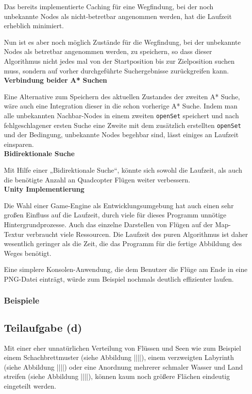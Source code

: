 \documentclass[a4paper,12pt]{article}
\newcommand{\code}{\texttt}
\begin{document}
Das bereits implementierte Caching für eine Wegfindung, bei der noch unbekannte Nodes als nicht-betretbar angenommen werden, hat die Laufzeit erheblich minimiert.

Nun ist es aber noch möglich Zustände für die Wegfindung, bei der unbekannte Nodes als betretbar angenommen werden, zu speichern, so dass dieser Algorithmus nicht jedes mal von der Startposition bis zur Zielposition suchen muss, sondern auf vorher durchgeführte Suchergebnisse zurückgreifen kann.
\\[0.4cm]
\textbf{Verbindung beider A* Suchen}

Eine Alternative zum Speichern des aktuellen Zustandes der zweiten A* Suche, wäre auch eine Integration dieser in die schon vorherige A* Suche. Indem man alle unbekannten Nachbar-Nodes in einem zweiten \code{openSet} speichert und nach fehlgeschlagener ersten Suche eine Zweite mit dem zusätzlich erstellten \code{openSet} und der Bedingung, unbekannte Nodes begehbar sind, lässt einiges an Laufzeit einsparen.
\\[0.4cm]
\textbf{Bidirektionale Suche}

Mit Hilfe einer „Bidirektionale Suche“, könnte sich sowohl die Laufzeit, als auch die benötigte Anzahl an Quadcopter Flügen weiter verbessern.
\\[0.4cm]
\textbf{Unity Implementierung}

Die Wahl einer Game-Engine als Entwicklungsumgebung hat auch einen sehr großen Einfluss auf die Laufzeit, durch viele für dieses Programm unnötige Hintergrundprozesse. Auch das einzelne Darstellen von Flügen auf der Map-Textur verbraucht viele Ressourcen. Die Laufzeit des puren Algorithmus ist daher wesentlich geringer als die Zeit, die das Programm für die fertige Abbildung des Weges benötigt.

Eine simplere Konsolen-Anwendung, die dem Benutzer die Flüge am Ende in eine PNG-Datei einträgt, würde zum Beispiel nochmals deutlich effizienter laufen.


\subsubsection{Beispiele}

\subsection{Teilaufgabe (d)}
Mit einer eher unnatürlichen Verteilung von Flüssen und Seen wie zum Beispiel einem Schachbrettmuster (siehe Abbildung ||||), einem verzweigten Labyrinth (siehe Abbildung ||||) oder eine Anordnung mehrerer schmaler Wasser und Land streifen (siehe Abbildung ||||), können kaum noch größere Flächen eindeutig eingeteilt werden.
\end{document}
